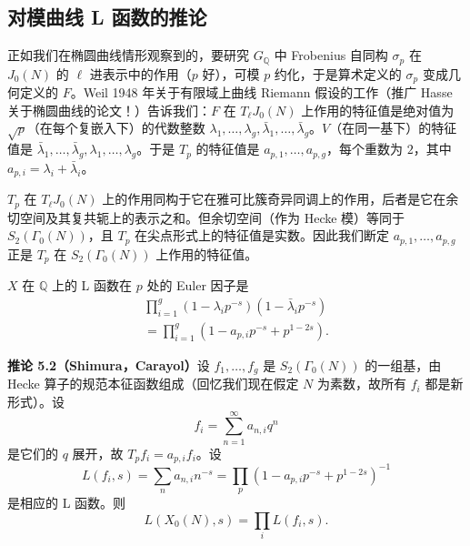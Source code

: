 \subsection{对模曲线 L 函数的推论}\label{c5:sec:5.2}

正如我们在椭圆曲线情形观察到的，要研究 $G_{\mathbb{Q}}$ 中 Frobenius 自同构 $\sigma_p$ 在 $J_0(N)$ 的 $\ell$ 进表示中的作用（$p$ 好），可模 $p$ 约化，于是算术定义的 $\sigma_p$ 变成几何定义的 $F$。Weil 1948 年关于有限域上曲线 Riemann 假设的工作（推广 Hasse 关于椭圆曲线的论文！）告诉我们：$F$ 在 $T_\ell J_0(N)$ 上作用的特征值是绝对值为 $\sqrt{p}$（在每个复嵌入下）的代数整数 $\lambda_1,\dots,\lambda_g,\bar\lambda_1,\dots,\bar\lambda_g$。$V$（在同一基下）的特征值是 $\bar\lambda_1,\dots,\bar\lambda_g,\lambda_1,\dots,\lambda_g$。于是 $T_p$ 的特征值是 $a_{p,1},\dots,a_{p,g}$，每个重数为 $2$，其中 $a_{p,i}=\lambda_i+\bar\lambda_i$。

$T_p$ 在 $T_\ell J_0(N)$ 上的作用同构于它在雅可比簇奇异同调上的作用，后者是它在余切空间及其复共轭上的表示之和。但余切空间（作为 Hecke 模）等同于 $S_2(\Gamma_0(N))$，且 $T_p$ 在尖点形式上的特征值是实数。因此我们断定 $a_{p,1},\dots,a_{p,g}$ 正是 $T_p$ 在 $S_2(\Gamma_0(N))$ 上作用的特征值。

$X$ 在 $\mathbb{Q}$ 上的 L 函数在 $p$ 处的 Euler 因子是
\begin{equation}\tag{5.6}\label{c5:eq:5.6}
\begin{gathered}
\prod_{i=1}^{g}(1-\lambda_ip^{-s})(1-\bar\lambda_ip^{-s})\\
=\prod_{i=1}^{g}(1-a_{p,i}p^{-s}+p^{1-2s}).
\end{gathered}
\end{equation}

\par\medskip\noindent\textbf{推论 5.2（Shimura，Carayol）}\quad 设 $f_1,\dots,f_g$ 是 $S_2(\Gamma_0(N))$ 的一组基，由 Hecke 算子的规范本征函数组成（回忆我们现在假定 $N$ 为素数，故所有 $f_i$ 都是新形式）。设
\begin{equation}\tag{5.7}\label{c5:eq:5.7}
f_i=\sum_{n=1}^{\infty}a_{n,i}q^n
\end{equation}
是它们的 $q$ 展开，故 $T_pf_i=a_{p,i}f_i$。设
\begin{equation}\tag{5.8}\label{c5:eq:5.8}
L(f_i,s)=\sum_n a_{n,i}n^{-s}=\prod_p(1-a_{p,i}p^{-s}+p^{1-2s})^{-1}
\end{equation}
是相应的 L 函数。则
\begin{equation}\tag{5.9}\label{c5:eq:5.9}
L(X_0(N),s)=\prod_i L(f_i,s).
\end{equation}

